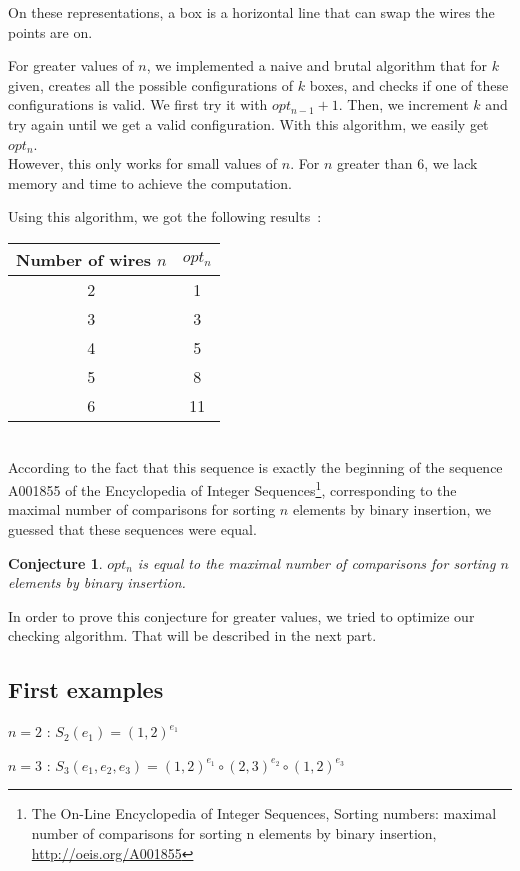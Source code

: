 \documentclass[11pt, a4paper]{article}
\newtheorem*{Conj*}{Conjecture}
\begin{document}
On these representations, a box is a horizontal line that can swap the wires the points are on.

For greater values of $n$, we implemented a naive and brutal algorithm that for
$k$ given, creates all the possible configurations of $k$ boxes, and checks if
one of these configurations is valid. We first try it with $opt_{n-1}+1$. Then,
we increment $k$ and try again until we get a valid configuration.  With this
algorithm, we easily get $opt_n$.\\
However, this only works for small values of $n$. For $n$ greater than 6, we
lack memory and time to achieve the computation.

Using this algorithm, we got the following results~:

\begin{tabular}{|c|c|}
\hline
Number of wires $n$ & $opt_n$ \\
\hline
2 & 1 \\
3 & 3 \\
4 & 5 \\
5 & 8 \\
6 & 11 \\
\hline
\end{tabular}\\

According to the fact that this sequence is exactly the beginning of the
sequence A001855 of the Encyclopedia of Integer Sequences\footnote{The On-Line
Encyclopedia of Integer Sequences, Sorting numbers: maximal number of
comparisons for sorting n elements by binary insertion,
\url{http://oeis.org/A001855}}, corresponding to the maximal number of
comparisons for sorting $n$ elements by binary insertion, we guessed that these
sequences were equal.

\Large
\begin{Conj*}
$opt_n$ is equal to the maximal number of comparisons for sorting $n$ elements
by binary insertion.
\end{Conj*}
\normalsize

In order to prove this conjecture for greater values, we tried to optimize our
checking algorithm. That will be described in the next part.

\subsection{First examples}

$n=2$ : $S_2(e_1) = (1,2)^{e_1}$

$n=3$ : $S_3(e_1,e_2,e_3) = (1,2)^{e_1} \circ (2,3)^{e_2} \circ (1,2)^{e_3}$
\end{document}
